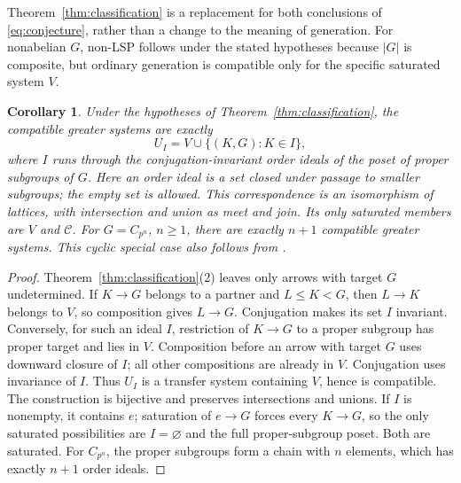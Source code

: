 \documentclass[11pt]{article}
\newtheorem{corollary}[theorem]{Corollary}
\begin{document}
Theorem~\ref{thm:classification} is a replacement for both conclusions
of \eqref{eq:conjecture}, rather than a change to the meaning of generation.
For nonabelian $G$, non-LSP follows under the stated hypotheses because
$|G|$ is composite, but ordinary generation is compatible only for the
specific saturated system $V$.

\begin{corollary}\label{cor:ideals}
Under the hypotheses of Theorem~\ref{thm:classification}, the compatible
greater systems are exactly
\[
 U_I=V\cup\{(K,G):K\in I\},
\]
where $I$ runs through the conjugation-invariant order ideals of the
poset of proper subgroups of $G$.
Here an order ideal is a set closed under passage to smaller subgroups;
the empty set is allowed.
This correspondence is an isomorphism of lattices, with intersection and
union as meet and join. Its only saturated members are $V$ and $\mathcal C$.
For $G=C_{p^n}$, $n\geq1$, there are exactly $n+1$ compatible greater systems.
This cyclic special case also follows from \cite[Proposition 3.2]{HML}.
\end{corollary}
\begin{proof}
Theorem~\ref{thm:classification}(2) leaves only arrows with target $G$
undetermined. If $K\to G$ belongs to a partner and $L\leq K<G$, then
$L\to K$ belongs to $V$, so composition gives $L\to G$.
Conjugation makes its set $I$ invariant.
Conversely, for such an ideal $I$, restriction of $K\to G$ to a proper
subgroup has proper target and lies in $V$. Composition before an arrow
with target $G$ uses downward closure of $I$; all other compositions
are already in $V$. Conjugation uses invariance of $I$.
Thus $U_I$ is a transfer system containing $V$, hence is compatible.
The construction is bijective and preserves intersections and unions.
If $I$ is nonempty, it contains $e$; saturation of $e\to G$ forces
every $K\to G$, so the only saturated possibilities are $I=\varnothing$
and the full proper-subgroup poset. Both are saturated.
For $C_{p^n}$, the proper subgroups form a chain with $n$ elements,
which has exactly $n+1$ order ideals.
\end{proof}
\end{document}
